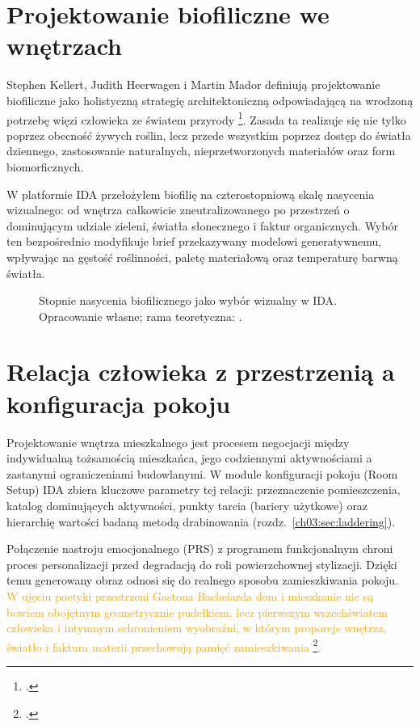 \section{Projektowanie biofiliczne we wnętrzach}
\label{ch02:sec:biophilia}

Stephen Kellert, Judith Heerwagen i Martin Mador definiują projektowanie biofiliczne jako holistyczną strategię architektoniczną odpowiadającą na wrodzoną potrzebę więzi człowieka ze światem przyrody \footcite{kellert2008biophilic}. Zasada ta realizuje się nie tylko poprzez obecność żywych roślin, lecz przede wszystkim poprzez dostęp do światła dziennego, zastosowanie naturalnych, nieprzetworzonych materiałów oraz form biomorficznych.

W platformie IDA przełożyłem biofilię na czterostopniową skalę nasycenia wizualnego: od wnętrza całkowicie zneutralizowanego po przestrzeń o dominującym udziale zieleni, światła słonecznego i faktur organicznych.
Wybór ten bezpośrednio modyfikuje brief przekazywany modelowi generatywnemu, wpływając na gęstość roślinności, paletę materiałową oraz temperaturę barwną światła.

\begin{figure}[htbp]
  \centering
  \caption[Stopnie nasycenia biofilicznego jako wybór wizualny w IDA. Opracowanie własne; rama teoretyczna: Kellert, Heerwagen i Mador.]{Stopnie nasycenia biofilicznego jako wybór wizualny w IDA.
    Opracowanie własne; rama teoretyczna: \textcite{kellert2008biophilic}.}
  \label{fig:ch02:biophilia}
\end{figure}

\section{Relacja człowieka z przestrzenią a konfiguracja pokoju}
\label{ch02:sec:peo}

Projektowanie wnętrza mieszkalnego jest procesem negocjacji między indywidualną tożsamością mieszkańca, jego codziennymi aktywnościami a zastanymi ograniczeniami budowlanymi.
W module konfiguracji pokoju (Room Setup) IDA zbiera kluczowe parametry tej relacji: przeznaczenie pomieszczenia, katalog dominujących aktywności, punkty tarcia (bariery użytkowe) oraz hierarchię wartości badaną metodą drabinowania (rozdz.~\ref{ch03:sec:laddering}).

Połączenie nastroju emocjonalnego (PRS) z programem funkcjonalnym chroni proces personalizacji przed degradacją do roli powierzchownej stylizacji. Dzięki temu generowany obraz odnosi się do realnego sposobu zamieszkiwania pokoju. \textcolor{orange}{W ujęciu poetyki przestrzeni Gastona Bachelarda dom i mieszkanie nie są bowiem obojętnym geometrycznie pudełkiem, lecz pierwszym wszechświatem człowieka i intymnym schronieniem wyobraźni, w którym proporcje wnętrza, światło i faktura materii przechowują pamięć zamieszkiwania \footcite{bachelard1975wyobraznia}.}


